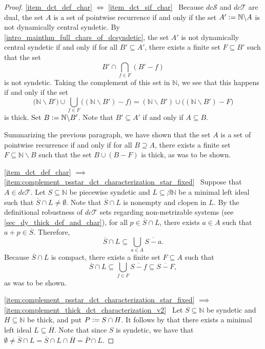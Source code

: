 \documentclass[letter,11pt]{article}
\theoremstyle{plain}
\theoremstyle{definition}
\theoremstyle{plain}
\theoremstyle{plain}
\numberwithin{equation}{section}
\newcommand{\N}{\mathbb{N}}
\newcommand{\defeq}{\vcentcolon=}
\renewcommand{\setminus}{\backslash}
\newcommand{\dcsyndetic}{dc\mathcal{S}}
\newcommand{\dcthick}{dc\mathcal{T}}
\begin{document}
\begin{proof}
    \eqref{item_dct_def_char} $\iff$ \eqref{item_dct_sif_char} \ Because $\dcsyndetic$ and $\dcthick$ are dual, the set $A$ is a set of pointwise recurrence if and only if the set $A' \defeq \N \setminus A$ is not dynamically central syndetic.  By \cref{intro_mainthm_full_chars_of_dcsyndetic}, the set $A'$ is not dynamically central syndetic if and only if for all $B' \subseteq A'$, there exists a finite set $F \subseteq B'$ such that the set
    \[B' \cap \bigcap_{f \in F} (B' - f)\]
    is not syndetic.  Taking the complement of this set in $\N$, we see that this happens if and only if the set
    \[\big( \N \setminus B' \big) \cup \bigcup_{f \in F} \big( (\N \setminus B') - f \big) = (\N \setminus B') \cup \big( (\N \setminus B')  - F \big)\]
    is thick.  Set $B \defeq \N \setminus B'$. Note that $B' \subseteq A'$ if and only if $A \subseteq B$.
    
    Summarizing the previous paragraph, we have shown that the set $A$ is a set of pointwise recurrence if and only if for all $B \supseteq A$, there exists a finite set $F \subseteq \N \setminus B$ such that the set $B \cup (B - F)$ is thick, as was to be shown.

    \eqref{item_dct_def_char} $\implies$ \eqref{item:complement_psstar_dct_characterization_star_fixed} \ Suppose that $A \in \dcthick$.  Let $S \subseteq \N$ be piecewise syndetic and $L \subseteq \beta \N$ be a minimal left ideal such that $\overline{S} \cap L \neq \emptyset$.  Note that $\overline{S} \cap L$ is nonempty and clopen in $L$.  By the definitional robustness of $\dcthick$ sets regarding non-metrizable systems (see \cref{sec_dy_thick_def_and_char}), for all $p \in \overline{S} \cap L$, there exists $a \in A$ such that $a + p \in \overline{S}$. Therefore,
    \[\overline{S} \cap L \subseteq \bigcup_{a \in A} \overline{S - a}.\]
    Because $\overline{S} \cap L$ is compact, there exists a finite set $F \subseteq A$ such that
    \[\overline{S} \cap L \subseteq \bigcup_{f \in F} \overline{S - f} \subseteq \overline{S-F},\]
    as was to be shown.

    \eqref{item:complement_psstar_dct_characterization_star_fixed} $\implies$ \eqref{item:complement_thick_dct_characterization_v2} \ Let $S \subseteq \N$ be syndetic and $H \subseteq \N$ be thick, and put $P \defeq S \cap H$.  It follows by \cite[Thm. 4.48]{hindman_strauss_book_2012} that there exists a minimal left ideal $L \subseteq \overline{H}$.  Note that since $S$ is syndetic, we have that $\emptyset \neq \overline{S} \cap L = \overline{S} \cap L \cap \overline{H} = \overline{P} \cap L$.
    

\end{proof}
\end{document}
